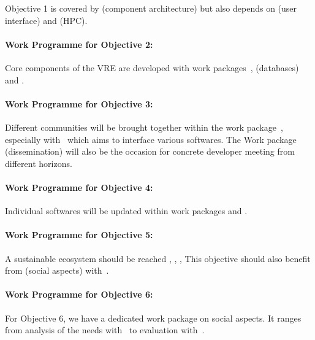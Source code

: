 \documentclass[noworkareas,deliverables,\classoptions]{euproposal}       %
\begin{document}
\begin{proposal}
Objective 1 is covered by  (component architecture) but also depends
on  (user interface) and  (HPC).

\paragraph{Work Programme for Objective 2: }

Core components of the VRE are developed with work packages~,
  (databases) and .

\paragraph{Work Programme for Objective 3: }

Different communities will be brought together within the work package~,
especially with~ which aims to interface
various softwares. The Work package~ (dissemination) will also be the occasion
for concrete developer meeting from different horizons.

\paragraph{Work Programme for Objective 4: }

Individual softwares will be updated within work packages  and .

\paragraph{Work Programme for Objective 5: }

A sustainable ecosystem should be reached
, , ,  
This objective should also benefit from  (social aspects) with~.

\paragraph{Work Programme for Objective 6: }

For Objective 6, we have a dedicated work package  on social aspects.
It ranges from analysis of the needs with~ to
evaluation with~.


\end{proposal}
\end{document}
